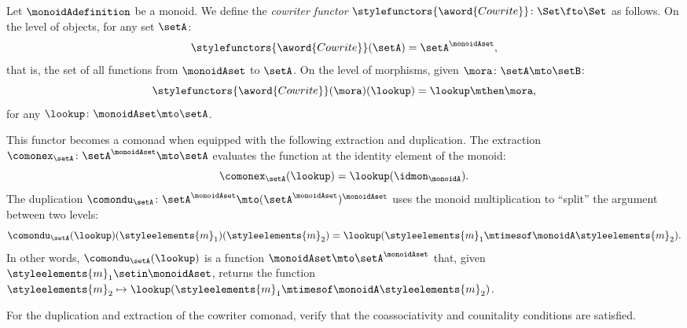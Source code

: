 \begin{example}
\label{exa:cowriter-comonad}

Let $\monoidAdefinition$ be a monoid. We define the \emph{cowriter functor} $\stylefunctors{\aword{Cowrite}} \colon \Set \fto \Set$ as follows. On the level of objects, for any set $\setA$:
\begin{equation}
    \stylefunctors{\aword{Cowrite}}(\setA) = \setA^{\monoidAset},
\end{equation}
that is, the set of all functions from $\monoidAset$ to $\setA$. On the level of morphisms, given $\mora \colon \setA \mto \setB$:
\begin{equation}
    \stylefunctors{\aword{Cowrite}}(\mora)(\lookup) = \lookup \mthen \mora,
\end{equation}
for any $\lookup \colon \monoidAset \mto \setA$.

This functor becomes a comonad when equipped with the following extraction and duplication. The extraction $\comonex_\setA \colon \setA^{\monoidAset} \mto \setA$ evaluates the function at the identity element of the monoid:
\begin{equation}\label{eq:cowriter-comonad-extraction}
    \comonex_\setA(\lookup) = \lookup(\idmon_\monoidA).
\end{equation}
The duplication $\comondu_\setA \colon \setA^{\monoidAset} \mto (\setA^{\monoidAset})^{\monoidAset}$ uses the monoid multiplication to ``split'' the argument between two levels:
\begin{equation}\label{eq:cowriter-comonad-duplication}
    \comondu_\setA(\lookup)(\styleelements{m}_1)(\styleelements{m}_2) = \lookup(\styleelements{m}_1 \mtimesof\monoidA \styleelements{m}_2).
\end{equation}
In other words, $\comondu_\setA(\lookup)$ is a function $\monoidAset \mto \setA^{\monoidAset}$ that, given $\styleelements{m}_1 \setin \monoidAset$, returns the function $\styleelements{m}_2 \mapsto \lookup(\styleelements{m}_1 \mtimesof\monoidA \styleelements{m}_2)$.

\end{example}

\begin{gradedexercise}
For the duplication and extraction of the cowriter comonad, verify that the coassociativity and counitality conditions are satisfied. 
\end{gradedexercise}


